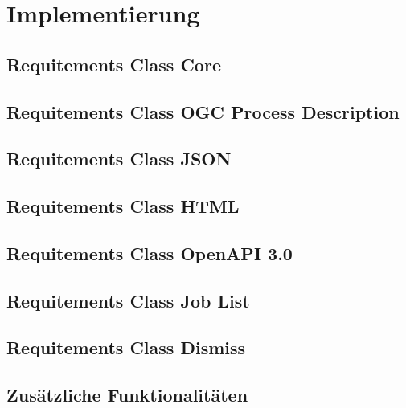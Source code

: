 \newpage
\restoregeometry
\section{Implementierung}
\subsection{Requitements Class Core}
\subsection{Requitements Class OGC Process Description}
\subsection{Requitements Class JSON}
\subsection{Requitements Class HTML}
\subsection{Requitements Class OpenAPI 3.0}
\subsection{Requitements Class Job List}
\subsection{Requitements Class Dismiss}
\subsection{Zusätzliche Funktionalitäten}
